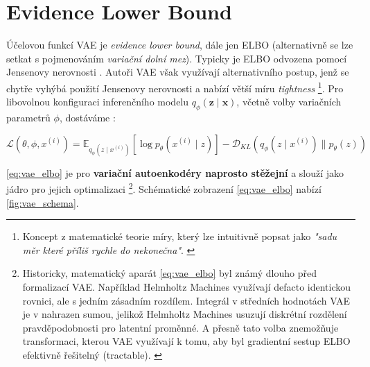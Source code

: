 \newpage
\section{Evidence Lower Bound}
Účelovou funkcí VAE je \emph{evidence lower bound}, dále jen ELBO (alternativně se lze setkat s pojmenováním \emph{variační dolní mez}).
Typicky je ELBO odvozena pomocí Jensenovy nerovnosti \cite[Sekce 4.2]{Wasserman2013}.
Autoři VAE \cite{Kingma2014} však využívají alternativního postup, jenž se chytře vyhýbá použití Jensenovy nerovnosti a nabízí větší míru \emph{tightness}
\footnote{Koncept z matematické teorie míry, který lze intuitivně popsat jako \emph{"sadu měr které příliš rychle  do nekonečna"}. \cite{Topsoee1974}}. 
Pro libovolnou konfiguraci inferenčního modelu $q_\phi(\textbf{z}\mid\textbf{x})$, včetně volby variačních parametrů $\phi$, dostáváme \cite[Rovnice 3]{Kingma2014}:

\begin{equation}
    \label{eq:vae_elbo}
    \mathcal{L}(\theta,\phi,x^{(i)}) = \mathds{E}_{q_\phi(z\mid x^{(i)})} \left[ \log p_\theta(x^{(i)}\mid z) \right] - \mathcal{D}_{KL}(q_\phi(z\mid x^{(i)})\parallel p_\theta(z))
\end{equation}

\autoref{eq:vae_elbo} je pro \textbf{variační autoenkodéry naprosto stěžejní} a slouží jako jádro pro jejich optimalizaci
\footnote{Historicky, matematický aparát \autoref{eq:vae_elbo} byl známý dlouho před formalizací VAE. Například Helmholtz Machines \cite{Dayan1995} využívají defacto identickou rovnici, ale s jedním zásadním rozdílem. Integrál v středních hodnotách VAE je v \cite[Rovnice 5]{Dayan1995} nahrazen sumou, jelikož Helmholtz Machines usuzují diskrétní rozdělení pravděpodobnosti pro latentní proměnné. A přesně tato volba znemožňuje transformaci, kterou VAE využívají k tomu, aby byl gradientní sestup ELBO efektivně řešitelný (tractable). \cite{Doersch2021}}. \cite{Doersch2021}
Schématické zobrazení \autoref{eq:vae_elbo} nabízí \autoref{fig:vae_schema}.

